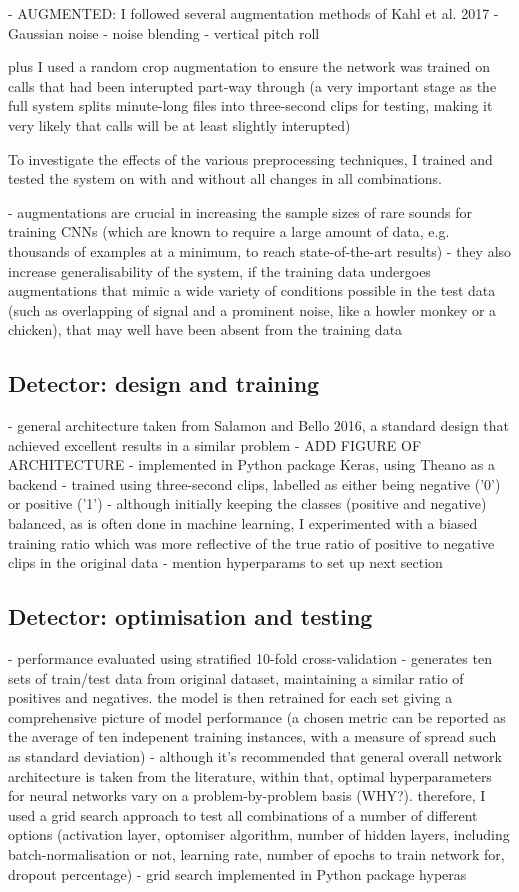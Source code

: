 \documentclass[11pt]{article}
\begin{document}
- AUGMENTED:
I followed several augmentation methods of Kahl et al. 2017
	- Gaussian noise
	- noise blending
	- vertical pitch roll 

plus I used a random crop augmentation to ensure the network was trained on calls that had been interupted part-way through (a very important stage as the full system splits minute-long files into three-second clips for testing, making it very likely that calls will be at least slightly interupted)

To investigate the effects of the various preprocessing techniques, I trained and tested the system on with and without all changes in all combinations.

- augmentations are crucial in increasing the sample sizes of rare sounds for training CNNs (which are known to require a large amount of data, e.g. thousands of examples at a minimum, to reach state-of-the-art results)
- they also increase generalisability of the system, if the training data undergoes augmentations that mimic a wide variety of conditions possible in the test data (such as overlapping of signal and a prominent noise, like a howler monkey or a chicken), that may well have been absent from the training data

\subsection{Detector: design and training}
- general architecture taken from Salamon and Bello 2016, a standard design that achieved excellent results in a similar problem 
- ADD FIGURE OF ARCHITECTURE
- implemented in Python package Keras, using Theano as a backend 
- trained using three-second clips, labelled as either being negative ('0') or positive ('1')
- although initially keeping the classes (positive and negative) balanced, as is often done in machine learning, I experimented with a biased training ratio which was more reflective of the true ratio of positive to negative clips in the original data
- mention hyperparams to set up next section 
\subsection{Detector: optimisation and testing}
- performance evaluated using stratified 10-fold cross-validation 
- generates ten sets of train/test data from original dataset, maintaining a similar ratio of positives and negatives. the model is then retrained for each set giving a comprehensive picture of model performance (a chosen metric can be reported as the average of ten indepenent training instances, with a measure of spread such as standard deviation) 
- although it's recommended that general overall network architecture is taken from the literature, within that, optimal hyperparameters for neural networks vary on a problem-by-problem basis (WHY?). therefore, I used a grid search approach to test all combinations of a number of different options (activation layer, optomiser algorithm, number of hidden layers, including batch-normalisation or not, learning rate, number of epochs to train network for, dropout percentage)
- grid search implemented in Python package hyperas
\end{document}
